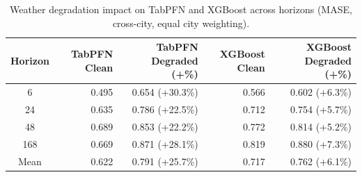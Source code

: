 \begin{table}
\centering
\caption{Weather degradation impact on TabPFN and XGBoost across horizons (MASE, cross-city, equal city weighting).}
\label{tab:degradation_tabpfn_xgboost_by_horizon}
\begin{tabular}{crrrr}
\toprule
Horizon & TabPFN Clean & TabPFN Degraded (+\%) & XGBoost Clean & XGBoost Degraded (+\%) \\
\midrule
6 & 0.495 & 0.654 (+30.3\%) & 0.566 & 0.602 (+6.3\%) \\
24 & 0.635 & 0.786 (+22.5\%) & 0.712 & 0.754 (+5.7\%) \\
48 & 0.689 & 0.853 (+22.2\%) & 0.772 & 0.814 (+5.2\%) \\
168 & 0.669 & 0.871 (+28.1\%) & 0.819 & 0.880 (+7.3\%) \\
\midrule
Mean & 0.622 & 0.791 (+25.7\%) & 0.717 & 0.762 (+6.1\%) \\
\bottomrule
\end{tabular}
\end{table}
